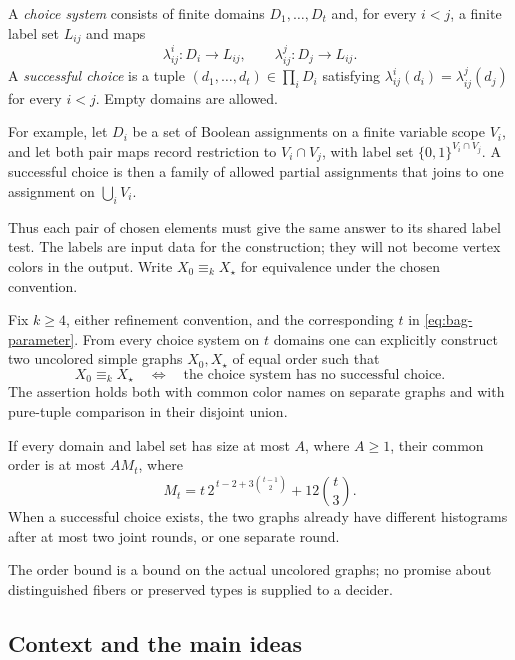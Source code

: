 \begin{definition}\label{def:choice}
A \emph{choice system} consists of finite domains \(D_1,\ldots,D_t\)
and, for every \(i<j\), a finite label set \(L_{ij}\) and maps
\[
 \lambda_{ij}^i:D_i\longrightarrow L_{ij},
 \qquad
 \lambda_{ij}^j:D_j\longrightarrow L_{ij}.
\]
A \emph{successful choice} is a tuple
\((d_1,\ldots,d_t)\in\prod_iD_i\) satisfying
\(\lambda_{ij}^i(d_i)=\lambda_{ij}^j(d_j)\) for every \(i<j\).
Empty domains are allowed.
\end{definition}

For example, let \(D_i\) be a set of Boolean assignments on a finite
variable scope \(V_i\), and let both pair maps record restriction to
\(V_i\cap V_j\), with label set \(\{0,1\}^{V_i\cap V_j}\).
A successful choice is then a family of allowed partial assignments
that joins to one assignment on \(\bigcup_i V_i\).

Thus each pair of chosen elements must give the same answer to its
shared label test. The labels are input data for the construction;
they will not become vertex colors in the output. Write
\(X_0\equiv_k X_\star\) for equivalence under the chosen convention.

\begin{theorem}\label{thm:choice-reduction}
Fix \(k\ge4\), either refinement convention, and the corresponding
\(t\) in \eqref{eq:bag-parameter}. From every choice system on \(t\)
domains one can explicitly construct two uncolored simple graphs
\(X_0,X_\star\) of equal order such that
\[
 X_0\equiv_k X_\star
 \quad\Longleftrightarrow\quad
 \text{the choice system has no successful choice}.
\]
The assertion holds both with common color names on separate graphs
and with pure-tuple comparison in their disjoint union.

If every domain and label set has size at most \(A\), where \(A\ge1\),
their common order is at most \(A M_t\), where
\[
 M_t=t\,2^{\,t-2+3\binom{t-1}{2}}+12\binom t3.
\]
When a successful choice exists, the two graphs already have different
histograms after at most two joint rounds, or one separate round.
\end{theorem}

The order bound is a bound on the actual uncolored graphs; no promise
about distinguished fibers or preserved types is supplied to a decider.

\subsection{Context and the main ideas}

